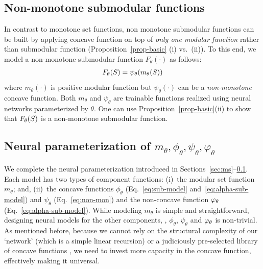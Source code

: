 \documentclass{article}
\begin{document}
\subsection{Non-monotone submodular functions} 
\label{sec:nms}

In contrast to monotone set functions, non monotone submodular functions
can be built by applying concave function on top of \emph{only one modular function} rather than submodular function (Proposition~\ref{prop-basic} (i) vs.\ (ii)).
%
To this end, we model a non-monotone submodular function $F_{\theta}(\cdot)$ as follows:
\begin{align}
F_{\theta}(S)= \psi_{\theta}(m_{\theta}(S)) \label{eq:non-mon}
\end{align}
where $m_{\theta}(\cdot)$ is positive modular function but $\psi_{\theta}(\cdot)$ can be a \emph{non-monotone} concave function. Both $m_{\theta}$ and $\psi_{\theta}$ are trainable functions realized using neural networks parameterized by $\theta$. One can use Proposition~\ref{prop-basic}(ii) to show that $F_{\theta}(S)$ is a non-monotone submodular function.
 
\subsection{Neural parameterization of $m_\theta, \phi_\theta, \psi_\theta, \varphi_\theta$} 

We complete the neural parameterization introduced in Sections~\ref{sec:ms}--\ref{sec:nms}.  Each model has two types of component functions: (i)~the modular set function $m_{\theta}$; and, (ii)~the concave functions $\phi_{\theta}$ (Eq.~\eqref{eq:sub-model} and~\eqref{eq:alpha-sub-model}) and $\psi_{\theta}$ (Eq.~\eqref{eq:non-mon})  and the non-concave function $\varphi_{\theta}$ (Eq.~\eqref{eq:alpha-sub-model}).  While modeling $m_{\theta}$ is simple and straightforward, designing neural models for the other components, \ie, $\phi_{\theta}$, $\psi_{\theta}$ and $\varphi_{\theta}$  is non-trivial.
As mentioned before, because we cannot rely on the structural complexity of our `network' (which is a simple linear recursion) or a judiciously pre-selected library of concave functions \citep{bilmes2017deep}, we need to invest more capacity in the concave function, effectively making it universal.
\end{document}
